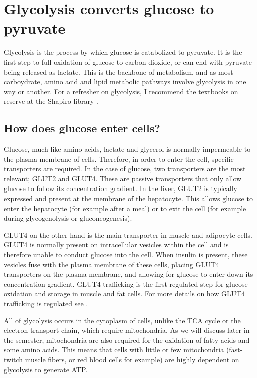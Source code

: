 \documentclass{tufte-handout}
\begin{document}
\pagebreak

\section{Glycolysis converts glucose to pyruvate}

Glycolysis is the process by which glucose is catabolized to pyruvate.  It is the first step to full oxidation of glucose to carbon dioxide, or can end with pyruvate being released as lactate.  This is the backbone of metabolism, and as most carboydrate, amino acid and lipid metabolic pathways involve glycolysis in one way or another.  For a refresher on glycolysis, I recommend the textbooks on reserve at the Shapiro library \citep{Berg2013,Ferrier2017}.

\subsection{How does glucose enter cells?}

Glucose, much like amino acids, lactate and glycerol is normally impermeable to the plasma membrane of cells.  Therefore, in order to enter the cell, specific transporters are required.  In the case of glucose, two transporters are the most relevant;  GLUT2 and GLUT4.  These are passive transporters that only allow glucose to follow its concentration gradient.  In the liver, GLUT2 is typically expressed and present at the membrane of the hepatocyte.  This allows glucose to enter the hepatocyte (for example after a meal) or to exit the cell (for example during glycogenolysis or gluconeogenesis).

GLUT4 on the other hand is the main transporter in muscle and adipocyte cells.  GLUT4 is normally present on intracellular vesicles within the cell and is therefore unable to conduct glucose into the cell.  When insulin is present, these vesicles fuse with the plasma membrane of these cells, placing GLUT4 transporters on the plasma membrane, and allowing for glucose to enter down its concentration gradient.  GLUT4 trafficking is the first regulated step for glucose oxidation and storage in muscle and fat cells.  For more details on how GLUT4 trafficking is regulated see \citet{Leto2013}.


  All of glycolysis occurs in the cytoplasm of cells, unlike the TCA cycle or the electron transport chain, which require mitochondria.  As we will discuss later in the semester, mitochondria are also required for the oxidation of fatty acids and some amino acids.  This means that cells with little or few mitochondria (fast-twitch muscle fibers, or red blood cells for example) are highly dependent on glycolysis to generate ATP.
\end{document}
